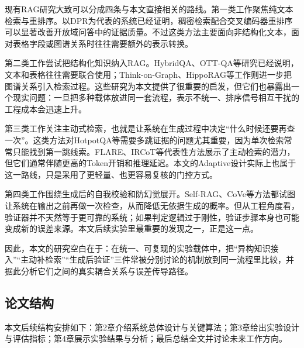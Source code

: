现有RAG研究大致可以分成四条与本文直接相关的路线。第一类工作聚焦纯文本检索与重排序。以DPR\cite{ref6}为代表的系统已经证明，稠密检索配合交叉编码器重排序可以显著改善开放域问答中的证据质量\cite{bm25, bert_rerank}。不过这类方法主要面向非结构化文本，面对表格字段或图谱关系时往往需要额外的表示转换\cite{manning_ir}。

第二类工作尝试把结构化知识纳入RAG。HybridQA\cite{hybridqa}、OTT-QA\cite{ottqa}等研究已经说明，文本和表格往往需要联合使用；Think-on-Graph\cite{ref17}、HippoRAG\cite{ref14}等工作则进一步把图谱关系引入检索过程\cite{graphdatabases, ref29}。这些研究为本文提供了很重要的启发，但它们也暴露出一个现实问题：一旦把多种载体放进同一套流程，表示不统一、排序信号相互干扰的工程成本会迅速上升\cite{ref30}。

第三类工作关注主动式检索，也就是让系统在生成过程中决定“什么时候还要再查一次”。这类方法对HotpotQA\cite{ref22}等需要多跳证据的问题尤其重要，因为单次检索常常只能找到第一跳线索\cite{twiki}。FLARE\cite{ref12}、IRCoT\cite{ref26}等代表性方法展示了主动检索的潜力\cite{ref10, ref23}，但它们通常伴随更高的Token开销和推理延迟\cite{ref33, ref34}。本文的Adaptive设计实际上也属于这一路线，只是采用了更轻量、也更容易复核的门控方式。

第四类工作围绕生成后的自我校验和防幻觉展开。Self-RAG\cite{ref8}、CoVe\cite{ref24}等方法都试图让系统在输出之前再做一次检查，从而降低无依据生成的概率\cite{ref25, ref35}。但从工程角度看，验证器并不天然等于更可靠的系统；如果判定逻辑过于刚性，验证步骤本身也可能变成新的误差来源。本文后续实验里最重要的发现之一，正是这一点。

因此，本文的研究空白在于：在统一、可复现的实验载体中，把“异构知识接入”“主动补检索”“生成后验证”三件常被分别讨论的机制放到同一流程里比较，并据此分析它们之间的真实耦合关系与误差传导路径。

\subsection{论文结构}

本文后续结构安排如下：第2章介绍系统总体设计与关键算法；第3章给出实验设计与评估指标；第4章展示实验结果与分析；最后总结全文并讨论未来工作方向。
